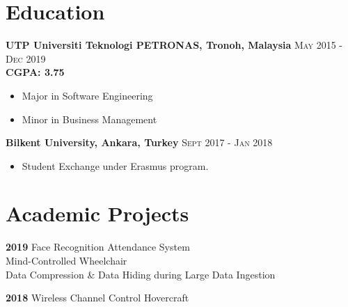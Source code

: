 \documentclass[English]{cv-style}
\begin{document}
\section{Education}
\vspace{-0.3cm}
\textbf{UTP Universiti Teknologi PETRONAS, Tronoh, Malaysia}
    \quad \quad \quad \quad \quad \quad \quad \quad \quad \quad
\textsc{May 2015 - Dec 2019} \\
    \quad \quad \quad \quad \quad \quad  
\textbf{CGPA: 3.75} \vspace{-0.15cm}
    \begin{itemize}[noitemsep]
        \item Major in Software Engineering
        \item Minor in Business Management
    \end{itemize}
\textbf{Bilkent University, Ankara, Turkey}
    \quad \quad \quad \quad \quad \quad \quad \quad \quad
    \quad \quad \quad \quad \quad \quad \quad \quad \quad
\textsc{ Sept 2017 - Jan 2018} \\
 \vspace{-0.15cm}
    \begin{itemize}[noitemsep]
        \item Student Exchange under Erasmus program.
    \end{itemize}
\section{Academic Projects}
\vspace{-0.2cm}
\textbf{2019}
    \vspace{0.1mm} {\quad \quad Face Recognition Attendance System} \\
    \vspace{0.1mm} {\quad \quad \quad \quad Mind-Controlled Wheelchair} \\
    \vspace{0.1mm} {\quad \quad \quad \quad Data Compression \& Data Hiding during Large Data Ingestion} 
    
\textbf{2018}
    \vspace{0.1mm} {\quad \quad Wireless Channel Control Hovercraft}    
 
\end{document}
